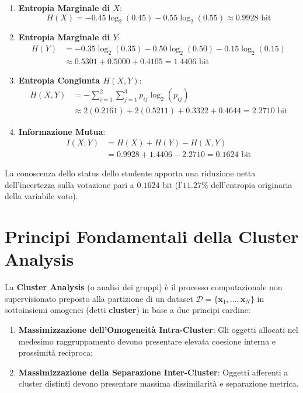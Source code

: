 \begin{enumerate}
    \item \textbf{Entropia Marginale di $X$}:
    \begin{equation}
        H(X) = - 0.45 \log_2(0.45) - 0.55 \log_2(0.55) \approx 0.9928 \text{ bit}
    \end{equation}
    \item \textbf{Entropia Marginale di $Y$}:
    \begin{align}
        H(Y) &= - 0.35 \log_2(0.35) - 0.50 \log_2(0.50) - 0.15 \log_2(0.15) \nonumber \\
        &\approx 0.5301 + 0.5000 + 0.4105 = 1.4406 \text{ bit}
    \end{align}
    \item \textbf{Entropia Congiunta $H(X, Y)$}:
    \begin{align}
        H(X, Y) &= - \sum_{i=1}^2 \sum_{j=1}^3 p_{ij} \log_2(p_{ij}) \nonumber \\
        &\approx 2(0.2161) + 2(0.5211) + 0.3322 + 0.4644 = 2.2710 \text{ bit}
    \end{align}
    \item \textbf{Informazione Mutua}:
    \begin{align}
        I(X; Y) &= H(X) + H(Y) - H(X, Y) \nonumber \\
        &= 0.9928 + 1.4406 - 2.2710 = 0.1624 \text{ bit}
    \end{align}
\end{enumerate}
La conoscenza dello status dello studente apporta una riduzione netta dell'incertezza sulla votazione pari a $0.1624$ bit (l'$11.27\%$ dell'entropia originaria della variabile voto).

\section{Principi Fondamentali della Cluster Analysis}
\label{sec:dm-cluster-analysis-principles}

La \textbf{Cluster Analysis} (o analisi dei gruppi) è il processo computazionale non supervisionato preposto alla partizione di un dataset $\mathcal{D} = \{\mathbf{x}_1, \dots, \mathbf{x}_N\}$ in sottoinsiemi omogenei (detti \textbf{cluster}) in base a due principi cardine:
\begin{enumerate}
    \item \textbf{Massimizzazione dell'Omogeneità Intra-Cluster}: Gli oggetti allocati nel medesimo raggruppamento devono presentare elevata coesione interna e prossimità reciproca;
    \item \textbf{Massimizzazione della Separazione Inter-Cluster}: Oggetti afferenti a cluster distinti devono presentare massima dissimilarità e separazione metrica.
\end{enumerate}

